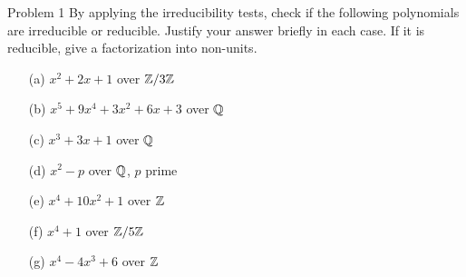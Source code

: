 \documentclass{hmwk}
\begin{document}
\maketitle

\begin{problem}{Problem 1}
    By applying the irreducibility tests, check if the following polynomials are irreducible or reducible. Justify your answer briefly in each case. If it is reducible, give a factorization into non-units.
    \begin{itemize}
        \item[(a)] $x^2 + 2x + 1$ over $\mathbb{Z}/3\mathbb{Z}$ 
        \item[(b)] $x^5 + 9x^4 + 3x^2 + 6x + 3$ over $\mathbb{Q}$
        \item[(c)] $x^3 + 3x + 1$ over $\mathbb{Q}$
        \item[(d)] $x^2 - p$ over $\mathbb{Q}$, $p$ prime
        \item[(e)] $x^4 + 10x^2 + 1$ over $\mathbb{Z}$
        \item[(f)] $x^4 + 1$ over $\mathbb{Z}/5\mathbb{Z}$
        \item[(g)] $x^4 - 4x^3 + 6$ over $\mathbb{Z}$
    \end{itemize}
\end{problem}
\end{document}
